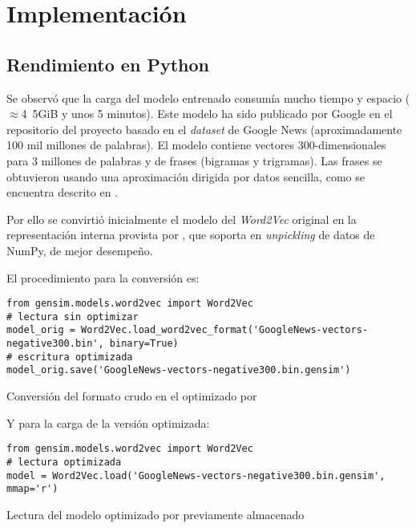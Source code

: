 
\chapter{Implementación}

\section{Rendimiento en Python}

Se observó que la carga del modelo entrenado  consumía mucho tiempo y espacio ($\approx$\si{4.5}{GiB} y unos 5 minutos). Este modelo ha sido publicado por Google en el repositorio del proyecto  basado en el \emph{dataset} de Google News (aproximadamente 100 mil millones de palabras). El modelo contiene vectores 300-dimensionales para 3 millones de palabras y de frases (bigramas y trigramas). Las frases se obtuvieron usando una aproximación dirigida por datos sencilla, como se encuentra descrito en \cite{DBLP:journals/corr/MikolovSCCD13}.

Por ello se convirtió inicialmente el modelo del \emph{Word2Vec} original en la representación interna provista por , que soporta en \emph{unpickling} de datos de NumPy, de mejor desempeño.

El procedimiento para la conversión es:
\nopagebreak
\begin{listing}[H]
\begin{verbatim}
from gensim.models.word2vec import Word2Vec
# lectura sin optimizar
model_orig = Word2Vec.load_word2vec_format('GoogleNews-vectors-negative300.bin', binary=True)
# escritura optimizada
model_orig.save('GoogleNews-vectors-negative300.bin.gensim')
\end{verbatim}
\caption{Conversión del formato crudo  en el optimizado por }
\label{lst:word2vec-convert}
\end{listing}

Y para la carga de la versión optimizada:
\nopagebreak
\begin{listing}[H]
\begin{verbatim}
from gensim.models.word2vec import Word2Vec
# lectura optimizada
model = Word2Vec.load('GoogleNews-vectors-negative300.bin.gensim', mmap='r')
\end{verbatim}
\caption{Lectura del modelo optimizado por  previamente almacenado}
\label{lst:word2vec-load}
\end{listing}
